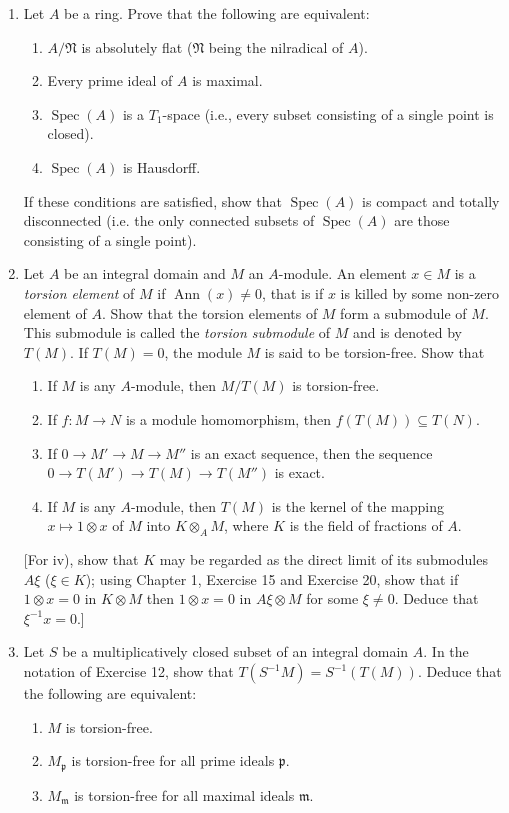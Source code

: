\begin{enumerate}
\item Let $A$ be a ring. Prove that the following are equivalent:
\begin{enumerate}
\renewcommand{\labelenumii}{\roman{enumii})}
\item $A/\mathfrak N$ is absolutely flat ($\mathfrak N$ being the nilradical of $A$).
\item Every prime ideal of $A$ is maximal.
\item $\operatorname{Spec}(A)$ is a $T_1$-space (i.e., every subset consisting of a single point is closed).
\item $\operatorname{Spec}(A)$ is Hausdorff.
\end{enumerate}
If these conditions are satisfied, show that $\operatorname{Spec}(A)$ is compact and totally disconnected (i.e. the only connected subsets of $\operatorname{Spec}(A)$ are those consisting of a single point).

\item Let $A$ be an integral domain and $M$ an $A$-module. An element $x\in M$ is a \textit{torsion element} of $M$ if $\operatorname{Ann}(x)\neq0$, that is if $x$ is killed by some non-zero element of $A$. Show that the torsion elements of $M$ form a submodule of $M$. This submodule is called the \textit{torsion submodule} of $M$ and is denoted by $T(M)$. If $T(M)=0$, the module $M$ is said to be torsion-free. Show that
\begin{enumerate}
\renewcommand{\labelenumii}{\roman{enumii})}
\item If $M$ is any $A$-module, then $M/T(M)$ is torsion-free.
\item If $f:M\longrightarrow N$ is a module homomorphism, then $f(T(M))\subseteq T(N)$.
\item If $0\longrightarrow M'\longrightarrow M\longrightarrow M''$ is an exact sequence, then the sequence $0\longrightarrow T(M')\longrightarrow T(M)\longrightarrow T(M'')$ is exact.
\item If $M$ is any $A$-module, then $T(M)$ is the kernel of the mapping $x\mapsto1\otimes x$ of $M$ into $K\otimes_A M$, where $K$ is the field of fractions of $A$.
\end{enumerate}
[For iv), show that $K$ may be regarded as the direct limit of its submodules $A\xi$ ($\xi\in K$); using Chapter 1, Exercise 15 and Exercise 20, show that if $1\otimes x=0$ in $K\otimes M$ then $1\otimes x=0$ in $A\xi\otimes M$ for some $\xi\neq0$. Deduce that $\xi^{-1}x=0$.]

\item Let $S$ be a multiplicatively closed subset of an integral domain $A$. In the notation of Exercise 12, show that $T(S^{-1}M)=S^{-1}(T(M))$. Deduce that the following are equivalent:
\begin{enumerate}
\renewcommand{\labelenumii}{\roman{enumii})}
\item $M$ is torsion-free.
\item $M_{\mathfrak p}$ is torsion-free for all prime ideals $\mathfrak p$.
\item $M_{\mathfrak m}$ is torsion-free for all maximal ideals $\mathfrak m$.
\end{enumerate}


\end{enumerate}
